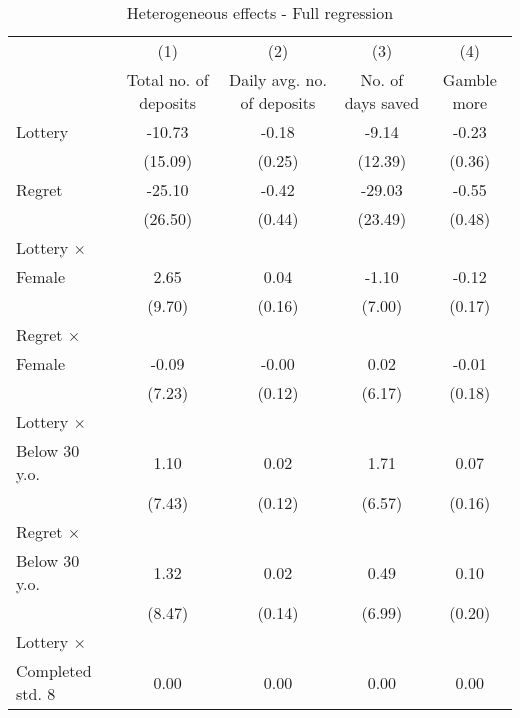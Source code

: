 \begin{table}[htbp]\centering
\def\sym#1{\ifmmode^{#1}\else\(^{#1}\)\fi}
\caption{Heterogeneous effects - Full regression}
\begin{tabular}{l*{4}{c}}
\toprule
                &\multicolumn{1}{c}{(1)}&\multicolumn{1}{c}{(2)}&\multicolumn{1}{c}{(3)}&\multicolumn{1}{c}{(4)}\\
                &\multicolumn{1}{c}{Total no. of deposits}&\multicolumn{1}{c}{Daily avg. no. of deposits}&\multicolumn{1}{c}{No. of days saved}&\multicolumn{1}{c}{Gamble more}\\
\midrule
Lottery         &   -10.73         &    -0.18         &    -9.14         &    -0.23         \\
                &  (15.09)         &   (0.25)         &  (12.39)         &   (0.36)         \\
\addlinespace
Regret          &   -25.10         &    -0.42         &   -29.03         &    -0.55         \\
                &  (26.50)         &   (0.44)         &  (23.49)         &   (0.48)         \\
\addlinespace
Lottery $\times$ \\ Female&     2.65         &     0.04         &    -1.10         &    -0.12         \\
                &   (9.70)         &   (0.16)         &   (7.00)         &   (0.17)         \\
\addlinespace
Regret $\times$ \\ Female&    -0.09         &    -0.00         &     0.02         &    -0.01         \\
                &   (7.23)         &   (0.12)         &   (6.17)         &   (0.18)         \\
\addlinespace
Lottery $\times$ \\ Below 30 y.o.&     1.10         &     0.02         &     1.71         &     0.07         \\
                &   (7.43)         &   (0.12)         &   (6.57)         &   (0.16)         \\
\addlinespace
Regret $\times$ \\ Below 30 y.o.&     1.32         &     0.02         &     0.49         &     0.10         \\
                &   (8.47)         &   (0.14)         &   (6.99)         &   (0.20)         \\
\addlinespace
Lottery $\times$ \\ Completed std. 8&     0.00         &     0.00         &     0.00         &     0.00         \\

\end{tabular}
\end{table}
